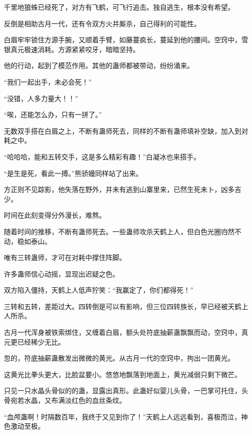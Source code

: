 \begin{this_body}
千里地狼蛛已经死了，对方有飞鹤，可飞行追击。独自逃生，根本没有希望。

反倒是相助古月一代，还有令双方火并厮杀，自己得利的可能性。

白眉牢牢锁住方源手腕，又顺着手臂，如藤蔓疯长，蔓延到他的腰间。空窍中，雪银真元极速消耗。方源紧紧咬牙，暗暗坚持。

他的行动，起到了模范作用。其他的蛊师都被带动，纷纷涌来。

“我们一起出手，未必会死！”

“没错，人多力量大！！”

“唉，还能怎么办，只有一拼了。”

无数双手搭在白眉之上，不断有蛊师死去，同样的不断有蛊师填补空缺，加入到对耗之中。

“哈哈哈，能和五转交手，这是多么精彩有趣！”白凝冰也来搭手。

“是生是死，看此一搏。”熊骄嫚同样站了出来。

方正则不见踪影，他失落在野外，并未有逃到山寨里来，已然生死未卜，凶多吉少。

时间在此刻变得分外漫长，难熬。

随着时间的推移，不断有蛊师死去。一些蛊师攻杀天鹤上人，但白色光圈岿然不动，稳如泰山。

唯有三转蛊师，才可在对耗中撑住阵脚。

许多蛊师信心动摇，显现出迟疑之色。

双方陷入僵持，天鹤上人低声狞笑：“我赢定了，你们都得死！”

三转和五转，差距过大。四转倒是可以有影响，但三位四转族长，早已经被天鹤上人所杀。

古月一代浑身被铁索绑住，又缠着白眉，额头处符底抽薪蛊飘飘而动，空窍中，真元更已经稀少无比。

忽的，符底抽薪蛊散发出微微的黄光。从古月一代的空窍中，拘出一团黄光。

这黄光比拳头更大，比脸盆要小。悠悠地飘落到地面上，黄光减弱只剩下微芒。

只见一只水晶头骨似的的蛊，显露出真形。此蛊好似婴儿头骨，一巴掌可托住，头骨宛若水晶，又布满淡红色的血丝条纹。

“血颅蛊啊！时隔数百年，我终于又见到你了！”天鹤上人远远看到，喜极而泣，神色激动至极。

\end{this_body}

